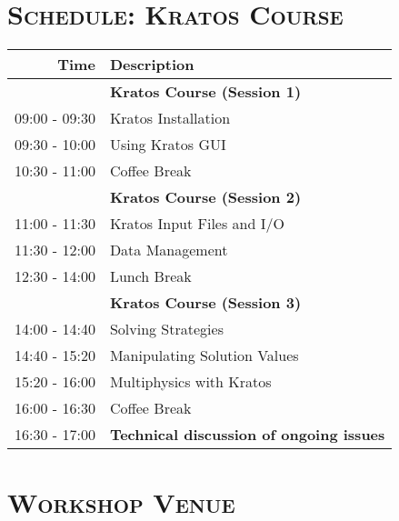\documentclass{article}
\begin{document}
\newpage
\section*{\centering \textsc{Schedule: Kratos Course}}

\begin{table}[h]\centering
   \begin{tabular}{r|l}
      \toprule\rule{0mm}{5mm}
      {\large Time} & {\large Description} \\[1ex]
      \midrule\rule{0mm}{4mm}
                    & {\large \textbf{Kratos Course (Session 1)}} \\[1ex]
      09:00 - 09:30 & Kratos Installation \\[1ex]
      09:30 - 10:00 & Using Kratos GUI \\[1ex]
      \hline\rule{0mm}{5mm}
      10:30 - 11:00 & Coffee Break \\[1ex]
      \hline\rule{0mm}{5mm}
                    & {\large \textbf{Kratos Course (Session 2)}} \\[1ex]
      11:00 - 11:30 & Kratos Input Files and I/O \\[1ex]
      11:30 - 12:00 & Data Management \\[1ex]
      \hline\rule{0mm}{5mm}
      12:30 - 14:00 & Lunch Break \\[1ex]
      \hline\rule{0mm}{5mm}
                    & {\large \textbf{Kratos Course (Session 3)}} \\[1ex]
      14:00 - 14:40 & Solving Strategies \\[1ex]
      14:40 - 15:20 & Manipulating Solution Values \\[1ex]
      15:20 - 16:00 & Multiphysics with Kratos \\[1ex]
      \hline\rule{0mm}{5mm}
      16:00 - 16:30 & Coffee Break \\[1ex]
      \hline\rule{0mm}{5mm}
      16:30 - 17:00 & {\large \textbf{Technical discussion of ongoing issues}} \\[1ex]
      \bottomrule
   \end{tabular}
\end{table}

\newpage
\section*{\centering \textsc{Workshop Venue}}
\end{document}
